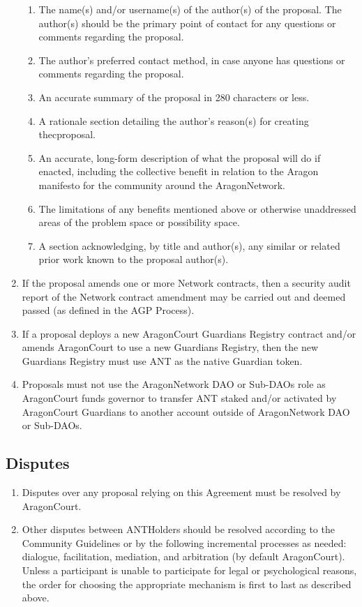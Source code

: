 \begin{enumerate}
\begin{enumerate}
		\item The name(s) and/or username(s) of the author(s) of the proposal.
		The author(s) should be the primary point of contact for any questions or comments regarding the proposal.
		\item The author’s preferred contact method, in case anyone has questions or comments regarding the proposal.
		\item An accurate summary of the proposal in 280 characters or less.
		\item A rationale section detailing the author’s reason(s) for creating thecproposal.
		\item An accurate, long-form description of what the proposal will do if enacted, including the collective benefit in relation to the Aragon manifesto for the community around the \gls{AragonNetwork}.
		\item The limitations of any benefits mentioned above or otherwise unaddressed areas of the problem space or possibility space.
		\item A section acknowledging, by title and author(s), any similar or related prior work known to the proposal author(s).
	\end{enumerate}

	\item If the proposal amends one or more Network contracts, then a security audit report of the Network contract amendment may be carried out and deemed passed (as defined in the \ac{AGP} Process).
	\item If a proposal deploys a new \gls{AragonCourt} \glspl{Guardian} Registry contract and/or
	amends \gls{AragonCourt} to use a new \glspl{Guardian} Registry, then the new \glspl{Guardian} Registry must use \ac{ANT} as the native \gls{Guardian} token.
	\item Proposals must not use the \gls{AragonNetwork} \ac{DAO} or Sub-\acp{DAO} role as \gls{AragonCourt} funds governor to transfer \ac{ANT} staked and/or activated by \gls{AragonCourt} \glspl{Guardian} to another account outside of \gls{AragonNetwork} \ac{DAO} or Sub-\acp{DAO}.
\end{enumerate}

\subsection{Disputes}
\begin{enumerate}
	\item Disputes over any proposal relying on this Agreement must be resolved by \gls{AragonCourt}.
	\item Other disputes between \glspl{ANTHolder} should be resolved according to the Community Guidelines or by the following incremental processes as needed: dialogue, facilitation, mediation, and arbitration (by default \gls{AragonCourt}).
	Unless a participant is unable to participate for legal or psychological reasons, the order for choosing the appropriate mechanism is first to last as described above.
\end{enumerate}

